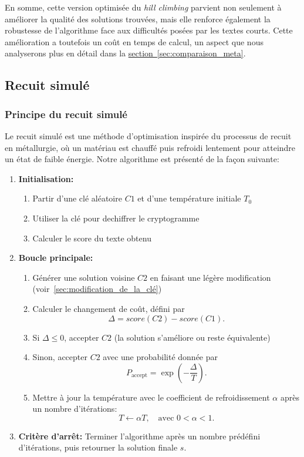 \documentclass[a4paper]{article}
\begin{document}
En somme, cette version optimisée du \textit{hill climbing} parvient non seulement à améliorer la qualité des solutions trouvées, mais elle renforce également la robustesse de l’algorithme face aux difficultés posées par les textes courts. Cette amélioration a toutefois un coût en temps de calcul, un aspect que nous analyserons plus en détail dans la \hyperref[sec:comparaison_meta]{section~\ref*{sec:comparaison_meta}}.

\subsection{Recuit simulé}
\subsubsection{Principe du recuit simulé}

Le recuit simulé est une méthode d’optimisation inspirée du processus de recuit en métallurgie, où un matériau est chauffé puis refroidi lentement pour atteindre un état de faible énergie.
Notre algorithme est présenté de la façon suivante:
\begin{enumerate}
    \item \textbf{Initialisation:} 
    \begin{enumerate}
        \item Partir d'une clé aléatoire $C1$ et d'une température initiale $T_0$
        \item Utiliser la clé pour dechiffrer le cryptogramme
        \item Calculer le score du texte obtenu
    \end{enumerate}
    \item \textbf{Boucle principale:}
    \begin{enumerate}[label= (\alph*)]
        \item Générer une solution voisine $C2$ en faisant une légère modification (voir~\ref{sec:modification_de_la_clé})
        \item Calculer le changement de coût, défini par
        \[
            \Delta = score(C2) - score(C1).
        \]
        \item Si $\Delta \leq 0$, accepter $C2$ (la solution s'améliore ou reste équivalente)
        \item Sinon, accepter $C2$ avec une probabilité donnée par
        \[
            P_{\text{accept}} = \exp\left(-\frac{\Delta}{T}\right).
        \]
        \item Mettre à jour la température avec le coefficient de refroidissement $\alpha$ après un nombre d'itérations:
        \[
            T \leftarrow \alpha T, \quad \text{avec } 0 < \alpha < 1.
        \]
    \end{enumerate}
    
    \item \textbf{Critère d'arrêt:} Terminer l'algorithme après un nombre prédéfini d'itérations, puis retourner la solution finale $s$.
\end{enumerate}
\end{document}

